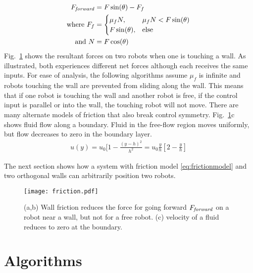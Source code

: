 \begin{align}
F_{\text{\emph{forward}}} &=  F \sin(\theta) - F_f  \nonumber \\
\text{where }  F_f &= \begin{cases}  \mu_f N, &  \mu_f N < F \sin(\theta)  \label{eq:frictionmodel}  \\
F \sin(\theta), & \text{else} \end{cases} \\ %
\text{and } N &= F \cos(\theta) \nonumber
\end{align}
 Fig.~\ref{fig:friction} shows the resultant forces on two robots when one is touching a wall. As illustrated, both experiences different net forces although each receives the same inputs.
  For ease of analysis, the following algorithms assume $\mu_f$ is infinite and robots touching the wall are prevented from sliding along the wall.
This means that if one robot is touching the wall and another robot is free, if the control input is parallel or into the wall, the touching robot will not move. 
There are many alternate models of friction that also break control symmetry. Fig.~\ref{fig:friction}c shows fluid flow along a boundary.  Fluid in the free-flow region moves uniformly, but flow decreases to zero in the boundary layer.  
\begin{align}
u(y) = u_0 [1- \frac{(y-h)^2}{h^2} = u_0 \frac{y}{h} [2- \frac{y}{h}] \label{eq:boundarylayerflow}
\end{align}

The next section shows how a system with friction model \eqref{eq:frictionmodel} and two orthogonal walls can arbitrarily position two robots. 
\begin{figure}[h]
\begin{center}
\texttt{[image: friction.pdf]} 
\vspace{-1em}
\caption{(a,b) Wall friction reduces the force for going forward $F_{\text{\emph{forward}}}$ on a robot near a wall, but not for a free robot. (c) velocity of a fluid reduces to zero at the boundary.}
\label{fig:friction}
\end{center}
\end{figure} 



\section{Algorithms}\label{sec:algorithms}
